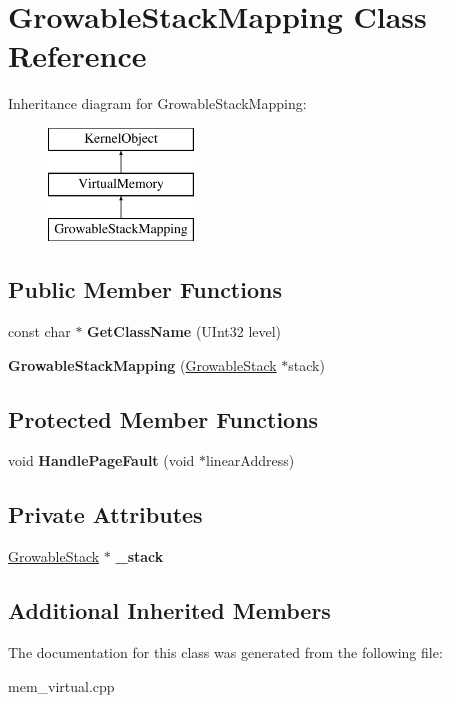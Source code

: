 \hypertarget{class_growable_stack_mapping}{}\section{Growable\+Stack\+Mapping Class Reference}
\label{class_growable_stack_mapping}
Inheritance diagram for Growable\+Stack\+Mapping\+:\begin{figure}[H]
\begin{center}
\leavevmode
\includegraphics[height=3.000000cm]{class_growable_stack_mapping}
\end{center}
\end{figure}
\subsection*{Public Member Functions}
\begin{DoxyCompactItemize}
\item 
\mbox{\label{class_growable_stack_mapping_a971ff1d54ebe4519e5d81eb23c450e15}} 
const char $\ast$ {\bfseries Get\+Class\+Name} (U\+Int32 level)
\item 
\mbox{\label{class_growable_stack_mapping_a0fd8a12a2711619ba496773ecc937729}} 
{\bfseries Growable\+Stack\+Mapping} (\hyperlink{class_growable_stack}{Growable\+Stack} $\ast$stack)
\end{DoxyCompactItemize}
\subsection*{Protected Member Functions}
\begin{DoxyCompactItemize}
\item 
\mbox{\label{class_growable_stack_mapping_a8cc1fccf0d1533f25238d89535583e09}} 
void {\bfseries Handle\+Page\+Fault} (void $\ast$linear\+Address)
\end{DoxyCompactItemize}
\subsection*{Private Attributes}
\begin{DoxyCompactItemize}
\item 
\mbox{\label{class_growable_stack_mapping_a8c2f805c3b03ec78d2b377380fce6ca1}} 
\hyperlink{class_growable_stack}{Growable\+Stack} $\ast$ {\bfseries \+\_\+stack}
\end{DoxyCompactItemize}
\subsection*{Additional Inherited Members}


The documentation for this class was generated from the following file\+:\begin{DoxyCompactItemize}
\item 
mem\+\_\+virtual.\+cpp\end{DoxyCompactItemize}
